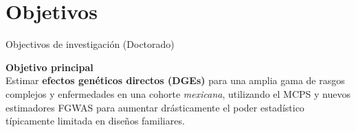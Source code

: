 \section{Objetivos}

\begin{frame}[c]{Objectivos de investigación (Doctorado)}
  \begin{center}
    {\sffamily\bfseries\Large\color{ccgblue}
      Objetivo principal
    }\\[0.25cm]
    {\sffamily\large
      Estimar \textbf{efectos genéticos directos (DGEs)} para una amplia gama de rasgos complejos
      y enfermedades en una cohorte \textit{mexicana}, utilizando el MCPS y nuevos estimadores
      FGWAS para aumentar drásticamente el poder estadístico típicamente limitada
      en diseños familiares.
    }
    \vfill

  \end{center}
\end{frame}


